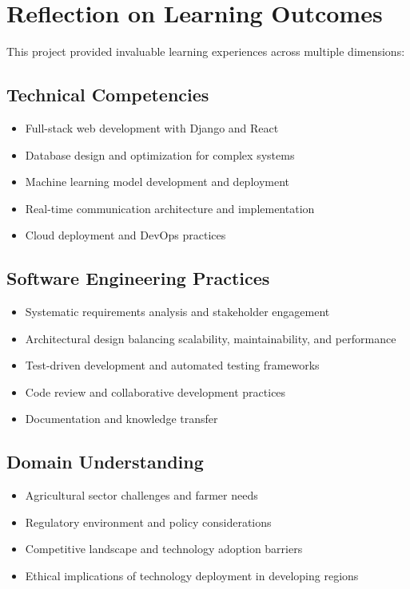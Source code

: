 \documentclass[12pt,a4paper]{report}
\begin{document}
\section{Reflection on Learning Outcomes}

This project provided invaluable learning experiences across multiple dimensions:

\subsection{Technical Competencies}

\begin{itemize}
    \item Full-stack web development with Django and React
    \item Database design and optimization for complex systems
    \item Machine learning model development and deployment
    \item Real-time communication architecture and implementation
    \item Cloud deployment and DevOps practices
\end{itemize}

\subsection{Software Engineering Practices}

\begin{itemize}
    \item Systematic requirements analysis and stakeholder engagement
    \item Architectural design balancing scalability, maintainability, and performance
    \item Test-driven development and automated testing frameworks
    \item Code review and collaborative development practices
    \item Documentation and knowledge transfer
\end{itemize}

\subsection{Domain Understanding}

\begin{itemize}
    \item Agricultural sector challenges and farmer needs
    \item Regulatory environment and policy considerations
    \item Competitive landscape and technology adoption barriers
    \item Ethical implications of technology deployment in developing regions
\end{itemize}
\end{document}
